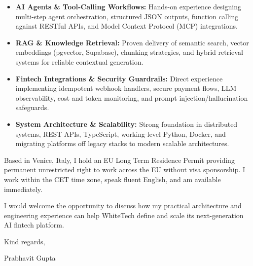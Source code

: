 \documentclass[11pt,a4paper]{article}
\begin{document}
\begin{itemize}[leftmargin=*]
    \item \textbf{AI Agents \& Tool-Calling Workflows:} Hands-on experience designing multi-step agent orchestration, structured JSON outputs, function calling against RESTful APIs, and Model Context Protocol (MCP) integrations.
    \item \textbf{RAG \& Knowledge Retrieval:} Proven delivery of semantic search, vector embeddings (pgvector, Supabase), chunking strategies, and hybrid retrieval systems for reliable contextual generation.
    \item \textbf{Fintech Integrations \& Security Guardrails:} Direct experience implementing idempotent webhook handlers, secure payment flows, LLM observability, cost and token monitoring, and prompt injection/hallucination safeguards.
    \item \textbf{System Architecture \& Scalability:} Strong foundation in distributed systems, REST APIs, TypeScript, working-level Python, Docker, and migrating platforms off legacy stacks to modern scalable architectures.
\end{itemize}

\noindent Based in Venice, Italy, I hold an EU Long Term Residence Permit providing permanent unrestricted right to work across the EU without visa sponsorship. I work within the CET time zone, speak fluent English, and am available immediately.

\noindent I would welcome the opportunity to discuss how my practical architecture and engineering experience can help WhiteTech define and scale its next-generation AI fintech platform.

\vspace{8pt}

\noindent Kind regards,

\vspace{8pt}

\noindent Prabhavit Gupta
\end{document}

